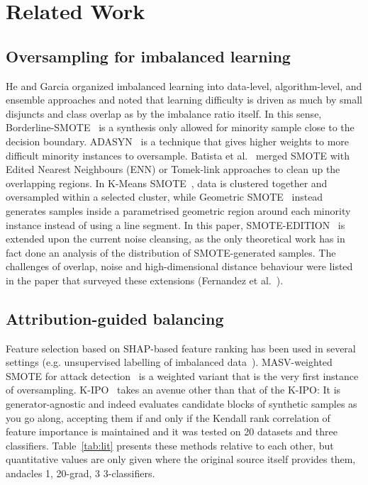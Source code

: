 \documentclass[conference]{IEEEtran}
\begin{document}
\section{Related Work}
\subsection{Oversampling for imbalanced learning}
He and Garcia organized imbalanced learning into data-level, algorithm-level, and ensemble approaches and noted that learning difficulty is driven as much by small disjuncts and class overlap as by the imbalance ratio itself. In this sense, Borderline-SMOTE~\cite{b12} is a synthesis only allowed for minority sample close to the decision boundary. ADASYN~\cite{b13} is a technique that gives higher weights to more difficult minority instances to oversample. Batista et al.~\cite{b14} merged SMOTE with Edited Nearest Neighbours (ENN) or Tomek-link approaches to clean up the overlapping regions. In K-Means SMOTE~\cite{b15}, data is clustered together and oversampled within a selected cluster, while Geometric SMOTE~\cite{b16} instead generates samples inside a parametrised geometric region around each minority instance instead of using a line segment. In this paper, SMOTE-EDITION~\cite{b4} is extended upon the current noise cleansing, as the only theoretical work has in fact done an analysis of the distribution of SMOTE-generated samples. The challenges of overlap, noise and high-dimensional distance behaviour were listed in the paper that surveyed these extensions (Fernandez et al.~\cite{b3}).

\subsection{Attribution-guided balancing}
Feature selection based on SHAP-based feature ranking has been used in several settings (e.g. unsupervised labelling of imbalanced data~\cite{b17}). MASV-weighted SMOTE for attack detection~\cite{b7} is a weighted variant that is the very first instance of oversampling. K-IPO~\cite{b8} takes an avenue other than that of the K-IPO: It is generator-agnostic and indeed evaluates candidate blocks of synthetic samples as you go along, accepting them if and only if the Kendall rank correlation of feature importance is maintained and it was tested on 20 datasets and three classifiers. Table~\ref{tab:lit} presents these methods relative to each other, but quantitative values are only given where the original source itself provides them, andacles 1, 20-grad, 3 3-classifiers.
\end{document}
